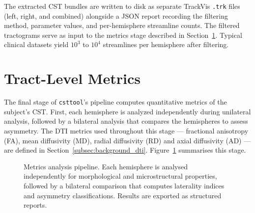 The extracted CST bundles are written to disk as separate TrackVis \texttt{.trk} files (left, right, and combined) alongside a JSON report recording the filtering method, parameter values, and per-hemisphere streamline counts. The filtered tractograms serve as input to the metrics stage described in Section~\ref{sec:methods_metrics}. Typical clinical datasets yield $10^3$ to $10^4$ streamlines per hemisphere after filtering.

\section{Tract-Level Metrics}
\label{sec:methods_metrics}

The final stage of \texttt{csttool}'s pipeline computes quantitative metrics of the subject's CST. First, each hemisphere is analyzed independently during unilateral analysis, followed by a bilateral analysis that compares the hemispheres to assess asymmetry. The DTI metrics used throughout this stage --- fractional anisotropy (FA), mean diffusivity (MD), radial diffusivity (RD) and axial diffusivity (AD) --- are defined in Section~\ref{subsec:background_dti}. Figure~\ref{fig:metrics_flowchart} summarises this stage.

\begin{figure}[htbp]
	\centering
	\caption{Metrics analysis pipeline. Each hemisphere is analysed independently for morphological and microstructural properties, followed by a bilateral comparison that computes laterality indices and asymmetry classifications. Results are exported as structured reports.}
	\label{fig:metrics_flowchart}
\end{figure}

